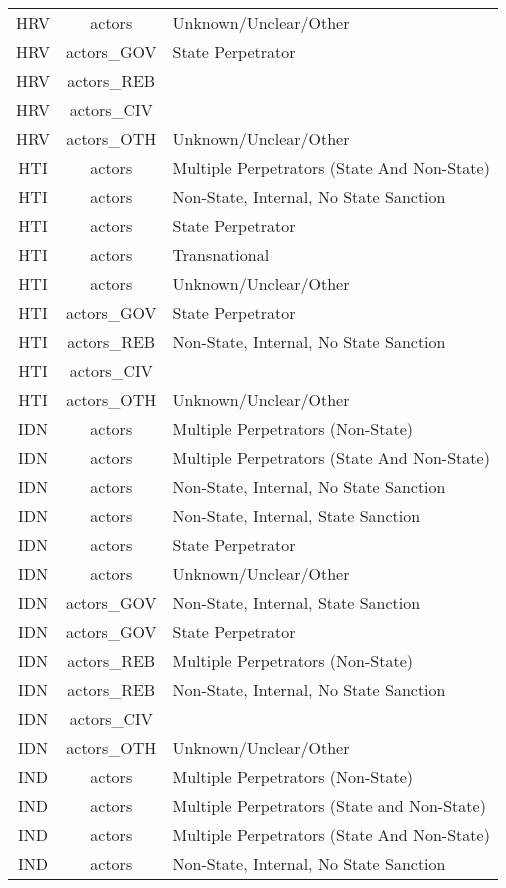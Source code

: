 \documentclass[12pt]{article}
\begin{document}
\begin{center}
\begin{longtable}{|c|c|p{10cm}|}
  HRV & actors & Unknown/Unclear/Other \\ 
  HRV & actors\_GOV & State Perpetrator \\ 
  HRV & actors\_REB &  \\ 
  HRV & actors\_CIV &  \\ 
  HRV & actors\_OTH & Unknown/Unclear/Other \\ 
  HTI & actors & Multiple Perpetrators (State And Non-State) \\ 
  HTI & actors & Non-State, Internal, No State Sanction \\ 
  HTI & actors & State Perpetrator \\ 
  HTI & actors & Transnational \\ 
  HTI & actors & Unknown/Unclear/Other \\ 
  HTI & actors\_GOV & State Perpetrator \\ 
  HTI & actors\_REB & Non-State, Internal, No State Sanction \\ 
  HTI & actors\_CIV &  \\ 
  HTI & actors\_OTH & Unknown/Unclear/Other \\ 
  IDN & actors & Multiple Perpetrators (Non-State) \\ 
  IDN & actors & Multiple Perpetrators (State And Non-State) \\ 
  IDN & actors & Non-State, Internal, No State Sanction \\ 
  IDN & actors & Non-State, Internal, State Sanction \\ 
  IDN & actors & State Perpetrator \\ 
  IDN & actors & Unknown/Unclear/Other \\ 
  IDN & actors\_GOV & Non-State, Internal, State Sanction \\ 
  IDN & actors\_GOV & State Perpetrator \\ 
  IDN & actors\_REB & Multiple Perpetrators (Non-State) \\ 
  IDN & actors\_REB & Non-State, Internal, No State Sanction \\ 
  IDN & actors\_CIV &  \\ 
  IDN & actors\_OTH & Unknown/Unclear/Other \\ 
  IND & actors & Multiple Perpetrators (Non-State) \\ 
  IND & actors & Multiple Perpetrators (State and Non-State) \\ 
  IND & actors & Multiple Perpetrators (State And Non-State) \\ 
  IND & actors & Non-State, Internal, No State Sanction \\ 

\end{longtable}
\end{center}
\end{document}

